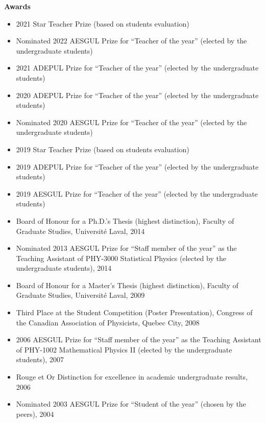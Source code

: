 \documentclass[11pt]{article}
\newcommand{\TitreSection}[1]{\colorbox{background}{\makebox[\textwidth-0.5em][c]{\Large\textrm{\textsc{#1}}}}\vspace{0.75\baselineskip}\\}
\begin{document}
%
%
%
\textbf{Awards}
%
\begin{itemize}
  \item 2021 Star Teacher Prize (based on students evaluation)
  \item Nominated 2022 AESGUL Prize for ``Teacher of the year'' (elected by the undergraduate students)
  \item 2021 ADEPUL Prize for ``Teacher of the year'' (elected by the undergraduate students)
  \item 2020 ADEPUL Prize for ``Teacher of the year'' (elected by the undergraduate students)
  \item Nominated 2020 AESGUL Prize for ``Teacher of the year'' (elected by the undergraduate students)
  \item 2019 Star Teacher Prize (based on students evaluation)
  \item 2019 ADEPUL Prize for ``Teacher of the year'' (elected by the undergraduate students)
  \item 2019 AESGUL Prize for ``Teacher of the year'' (elected by the undergraduate students)
  \item Board of Honour for a Ph.D.'s Thesis (highest distinction), Faculty of Graduate Studies, Universit\'e Laval, 2014
  \item Nominated 2013 AESGUL Prize for ``Staff member of the year'' as the Teaching Assistant of PHY-3000 Statistical Physics (elected by the undergraduate students), 2014
  \item Board of Honour for a Master's Thesis (highest distinction), Faculty of Graduate Studies, Universit\'e Laval, 2009
  \item Third Place at the Student Competition (Poster Presentation), Congress of the Canadian Association of Physicists, Quebec City, 2008
  \item 2006 AESGUL Prize for ``Staff member of the year'' as the Teaching Assistant of PHY-1002 Mathematical Physics II (elected by the undergraduate students), 2007
  \item Rouge et Or Distinction for excellence in academic undergraduate results, 2006
  \item Nominated 2003 AESGUL Prize for ``Student of the year'' (chosen by the peers), 2004
\end{itemize} \vspace{0.75\baselineskip}
%
%
%
%
%
\TitreSection{Teaching}
\end{document}
